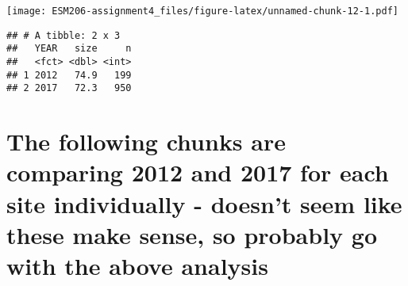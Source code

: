\documentclass[]{article}
\newenvironment{Shaded}{\begin{snugshade}}{\end{snugshade}}
\newcommand{\KeywordTok}[1]{\textcolor[rgb]{0.13,0.29,0.53}{\textbf{#1}}}
\newcommand{\DataTypeTok}[1]{\textcolor[rgb]{0.13,0.29,0.53}{#1}}
\newcommand{\StringTok}[1]{\textcolor[rgb]{0.31,0.60,0.02}{#1}}
\newcommand{\CommentTok}[1]{\textcolor[rgb]{0.56,0.35,0.01}{\textit{#1}}}
\newcommand{\OperatorTok}[1]{\textcolor[rgb]{0.81,0.36,0.00}{\textbf{#1}}}
\newcommand{\NormalTok}[1]{#1}
\begin{document}
\begin{Shaded}
\end{Shaded}

\texttt{[image: ESM206-assignment4\_files/figure-latex/unnamed-chunk-12-1.pdf]}

\begin{Shaded}
\end{Shaded}

\begin{verbatim}
## # A tibble: 2 x 3
##   YEAR   size     n
##   <fct> <dbl> <int>
## 1 2012   74.9   199
## 2 2017   72.3   950
\end{verbatim}

\section{The following chunks are comparing 2012 and 2017 for each site
individually - doesn't seem like these make sense, so probably go with
the above
analysis}\label{the-following-chunks-are-comparing-2012-and-2017-for-each-site-individually---doesnt-seem-like-these-make-sense-so-probably-go-with-the-above-analysis}
\end{document}
